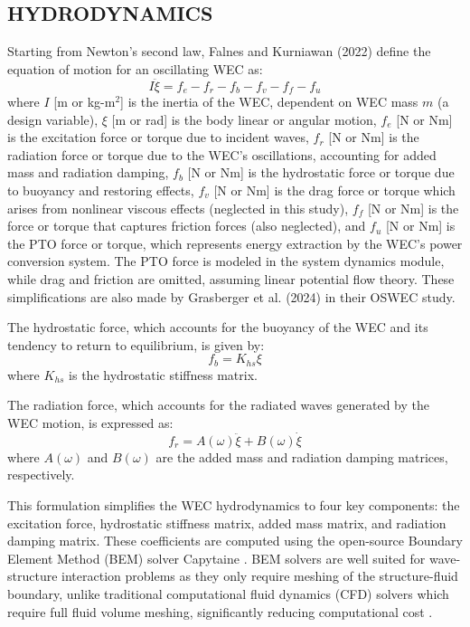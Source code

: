 \documentclass[twocolumn,10pt]{asme2e}
\begin{document}
\subsection{HYDRODYNAMICS} \label{sec:hydro}
Starting from Newton's second law, Falnes and Kurniawan (2022) \cite{falnes2022} define the equation of motion for an oscillating WEC as:
\begin{equation}
    \label{eq:wec}
    I\ddot{\xi} = f_e - f_r - f_b - f_v - f_f - f_u  
\end{equation}
\noindent where $I$ [m or kg-m$^2$] is the inertia of the WEC, dependent on WEC mass $m$ (a design variable), $\xi$ [m or rad] is the body linear or angular motion, $f_e$ [N or Nm] is the excitation force or torque due to incident waves, $f_r$ [N or Nm] is the radiation force or torque due to the WEC’s oscillations, accounting for added mass and radiation damping, $f_b$ [N or Nm] is the hydrostatic force or torque due to buoyancy and restoring effects, $f_v$ [N or Nm] is the drag force or torque which arises from nonlinear viscous effects (neglected in this study), $f_f$ [N or Nm] is the force or torque that captures friction forces (also neglected), and $f_u$ [N or Nm] is the PTO force or torque, which represents energy extraction by the WEC’s power conversion system. The PTO force is modeled in the system dynamics module, while drag and friction are omitted, assuming linear potential flow theory. These simplifications are also made by Grasberger et al. (2024) \cite{Grasberger2024} in their OSWEC study. 

The hydrostatic force, which accounts for the buoyancy of the WEC and its tendency to return to equilibrium, is given by: 
\begin{equation}
    \label{eq:hydrostatic}
    f_{b} = K_{hs} \xi
\end{equation}
\noindent where $K_{hs}$ is the hydrostatic stiffness matrix.

The radiation force, which accounts for the radiated waves generated by the WEC motion, is expressed as:
\begin{equation}
    \label{eq:radiation}
    f_r = A(\omega) \ddot{\xi} + B(\omega) \dot{\xi}
\end{equation}
\noindent where $A(\omega)$ and $B(\omega)$ are the added mass and radiation damping matrices, respectively.

This formulation simplifies the WEC hydrodynamics to four key components: the excitation force, hydrostatic stiffness matrix, added mass matrix, and radiation damping matrix. These coefficients are computed using the open-source Boundary Element Method (BEM) solver Capytaine \cite{ancellin_capytaine_2019}. BEM solvers are well suited for wave-structure interaction problems as they only require meshing of the structure-fluid boundary, unlike traditional computational fluid dynamics (CFD) solvers which require full fluid volume meshing, significantly reducing computational cost \cite{bem_wave}.
\end{document}
